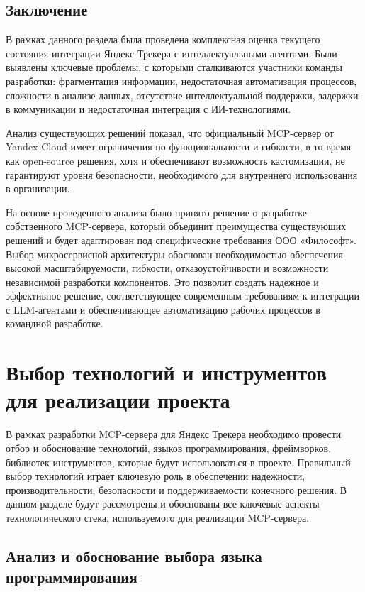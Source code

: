 \documentclass[utf8, russian]{eskdtext}
\let\stdsection\section
\renewcommand \section{\newpage\stdsection}
\begin{document}
\subsection{Заключение}

В рамках данного раздела была проведена комплексная оценка текущего состояния интеграции Яндекс Трекера с интеллектуальными агентами. Были выявлены ключевые проблемы, с которыми сталкиваются участники команды разработки: фрагментация информации, недостаточная автоматизация процессов, сложности в анализе данных, отсутствие интеллектуальной поддержки, задержки в коммуникации и недостаточная интеграция с ИИ-технологиями.

Анализ существующих решений показал, что официальный MCP-сервер от Yandex Cloud имеет ограничения по функциональности и гибкости, в то время как open-source решения, хотя и обеспечивают возможность кастомизации, не гарантируют уровня безопасности, необходимого для внутреннего использования в организации. 

На основе проведенного анализа было принято решение о разработке собственного MCP-сервера, который объединит преимущества существующих решений и будет адаптирован под специфические требования ООО «Философт». Выбор микросервисной архитектуры обоснован необходимостью обеспечения высокой масштабируемости, гибкости, отказоустойчивости и возможности независимой разработки компонентов. Это позволит создать надежное и эффективное решение, соответствующее современным требованиям к интеграции с LLM-агентами и обеспечивающее автоматизацию рабочих процессов в командной разработке.

\section{Выбор технологий и инструментов для реализации проекта}

В рамках разработки MCP-сервера для Яндекс Трекера необходимо провести отбор и обоснование технологий, языков программирования, фреймворков, библиотек инструментов, которые будут использоваться в проекте. Правильный выбор технологий играет ключевую роль в обеспечении надежности, производительности, безопасности и поддерживаемости конечного решения. В данном разделе будут рассмотрены и обоснованы все ключевые аспекты технологического стека, используемого для реализации MCP-сервера.
\subsection{Анализ и обоснование выбора языка программирования}
\end{document}
